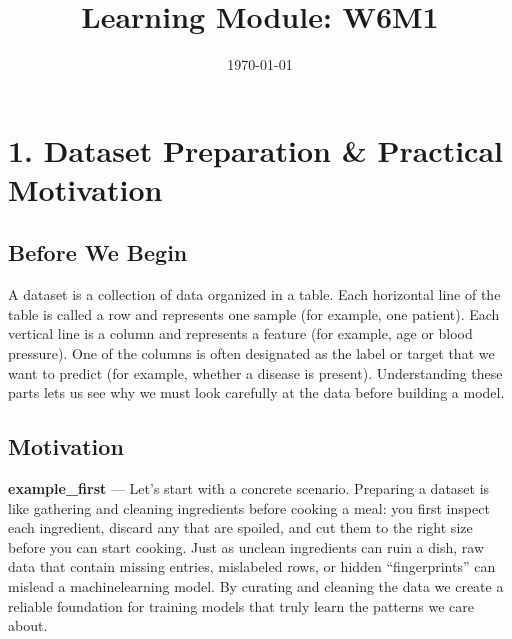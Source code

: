 \documentclass[12pt, a4paper]{article}
\title{Learning Module: W6M1}
\author{}
\date{\today}
\begin{document}
\maketitle
\thispagestyle{empty}
\newpage

\tableofcontents
\newpage


\section{1. Dataset Preparation \& Practical Motivation}

\subsection{Before We Begin}
A dataset is a collection of data organized in a table.  
Each horizontal line of the table is called a row and represents one sample (for example, one patient).  
Each vertical line is a column and represents a feature (for example, age or blood pressure).  
One of the columns is often designated as the label or target that we want to predict (for example, whether a disease is present).  
Understanding these parts lets us see why we must look carefully at the data before building a model.  

\subsection{Motivation}
\textbf{example\_first} --- Let's start with a concrete scenario.  
Preparing a dataset is like gathering and cleaning ingredients before cooking a meal: you first inspect each ingredient, discard any that are spoiled, and cut them to the right size before you can start cooking.  
Just as unclean ingredients can ruin a dish, raw data that contain missing entries, mislabeled rows, or hidden ``fingerprints'' can mislead a machinelearning model.  
By curating and cleaning the data we create a reliable foundation for training models that truly learn the patterns we care about.  
\end{document}
